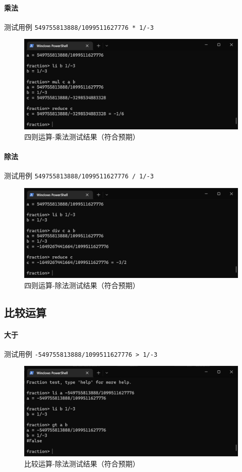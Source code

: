 \documentclass[cn,black,12pt,normal]{elegantnote}
\begin{document}
\paragraph{乘法} 测试用例 \lstinline{549755813888/1099511627776 * 1/-3}
\begin{figure}[H]
    \centering
    \includegraphics[width=.8\textwidth]{imgs/test_op_mul.jpg}
    \caption{四则运算-乘法测试结果（符合预期）}
\end{figure}

\paragraph{除法} 测试用例 \lstinline{549755813888/1099511627776 / 1/-3}
\begin{figure}[H]
    \centering
    \includegraphics[width=.8\textwidth]{imgs/test_op_div.jpg}
    \caption{四则运算-除法测试结果（符合预期）}
\end{figure}

\subsection{比较运算}

\paragraph{大于} 测试用例 \lstinline{-549755813888/1099511627776 > 1/-3}
\begin{figure}[H]
    \centering
    \includegraphics[width=.8\textwidth]{imgs/test_r_gt.jpg}
    \caption{比较运算-除法测试结果（符合预期）}
\end{figure}
\end{document}
